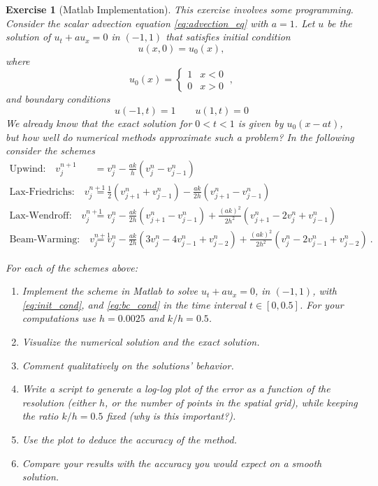 \documentclass[10pt,letterpaper]{article}
\theoremstyle{break}
\newtheorem{exercise}{Exercise}
\begin{document}
\begin{exercise}[Matlab Implementation]
	This exercise involves some programming.
	Consider the scalar advection equation \eqref{eq:advection_eq}
	with $a=1$.
	Let $u$ be the solution of $u_t+au_x=0$
	in $(-1,1)$ that satisfies initial condition
	\begin{equation}
		u(x,0)=u_{0}(x),
	\end{equation}
	where
	\begin{equation}\label{eq:init_cond}
		u_{0}(x)
		=
		\begin{cases}
				1 & x<0\\
				0 & x>0
		\end{cases}\ ,
	\end{equation}
	and boundary conditions
	\begin{equation}\label{eq:bc_cond}
		u(-1,t)=1
		\quad\quad
		u(1,t)=0
	\end{equation}
	We already know that the exact solution for $0<t<1$ is given by $u_{0}(x-at)$,
	but how well do numerical methods approximate such a problem?
	In the following consider the schemes
	\begin{align*}
		\textrm{Upwind:}\quad
			v_{j}^{n+1} & =v_{j}^{n}-\frac{ak}{h}(v_{j}^{n}-v_{j-1}^{n})\\
		\textrm{Lax-Friedrichs:}\quad
			v_{j}^{n+1} & =\frac{1}{2}(v_{j+1}^{n}+v_{j-1}^{n})
				-\frac{ak}{2h} (v_{j+1}^{n}-v_{j-1}^{n})\\
		\textrm{Lax-Wendroff:}\quad
			v_{j}^{n+1} & =v_{j}^{n}-\frac{ak}{2h}(v_{j+1}^{n}-v_{j-1}^{n})
				+\frac{(ak)^2}{2h^2}(v_{j+1}^{n}-2v_{j}^{n}+v_{j-1}^{n})\\
		\textrm{Beam-Warming:}\quad
			v_{j}^{n+1} & =v_{j}^{n}-\frac{ak}{2h}(3v_{j}^{n} -4v_{j-1}^{n}+v_{j-2}^{n})
				+\frac{(ak)^{2}}{2h^{2}} (v_{j}^{n}-2v_{j-1}^{n}+v_{j-2}^{n})\ .
	\end{align*}

	For each of the schemes above:
	\begin{enumerate}
	\item
	Implement the scheme in Matlab to solve $u_t+au_x=0$, 
	in $(-1,1)$, with \eqref{eq:init_cond}, and \eqref{eq:bc_cond} in the time interval $t\in[0,0.5]$. 
	For your computations use $h=0.0025$ and $k/h=0.5$.

	\item
	Visualize the numerical solution and the exact solution.

	\item
	Comment qualitatively on the solutions' behavior.

	\item
	Write a script to generate a log-log plot of the error as a function of the resolution 
	(either $h$, or the number of points in the spatial grid), 
	while keeping the ratio $k/h=0.5$ fixed (why is this important?).

	\item
	Use the plot to deduce the accuracy of the method.

	\item
	Compare your results with the accuracy you would expect on a smooth solution.
	\end{enumerate}
\end{exercise}
\end{document}
